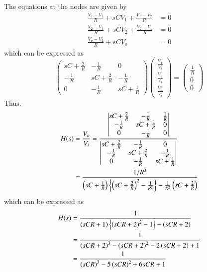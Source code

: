 \documentclass[journal,12pt,twocolumn]{IEEEtran}
\begin{document}
\solution The equations at the nodes are given by
%
\begin{align}
\frac{V_1-V_i}{R}+ {sCV_1} + \frac{V_1-V_2}{R} &= 0
\\
\frac{V_2-V_1}{R}+ {sCV_2} + \frac{V_2-V_o}{R} &= 0
\\
\frac{V_o-V_2}{R}+ {sCV_o} &= 0
\end{align}
%
which can be expressed as
%
\begin{equation}
\begin{pmatrix}
sC + \frac{2}{R} & -\frac{1}{R} & 0 
\\
-\frac{1}{R}  & sC + \frac{2}{R} & -\frac{1}{R}
\\
0 & -\frac{1}{R} & sC + \frac{1}{R} 
\end{pmatrix}
\begin{pmatrix}
\frac{V_1}{V_i}
\\
\frac{V_2}{V_i}
\\
\frac{V_o}{V_i}
\end{pmatrix}
= 
\begin{pmatrix}
\frac{1}{R}
\\
0
\\
0
\end{pmatrix}
\end{equation}
%
Thus,
\begin{align}
H(s) &= \frac{V_o}{V_i} = 
\frac{
\begin{vmatrix}
sC + \frac{2}{R} & -\frac{1}{R} & \frac{1}{R}
\\
-\frac{1}{R}  & sC + \frac{2}{R} & 0
\\
0 & -\frac{1}{R} & 0
\end{vmatrix}
}{
\begin{vmatrix}
sC + \frac{2}{R} & -\frac{1}{R} & 0 
\\
-\frac{1}{R}  & sC + \frac{2}{R} & -\frac{1}{R}
\\
0 & -\frac{1}{R} & sC + \frac{1}{R} 
\end{vmatrix}
}
\\
&= \frac{1/R^3}{\left(sC + \frac{1}{R} \right)\left\{\left(sC + \frac{2}{R} \right)^2-\frac{1}{R^2}\right\}-\frac{1}{R^2}\left(sC + \frac{2}{R} \right)}
\end{align}
%
which can be expressed as
%
\begin{align}
H(s) &= \frac{1}{\left(sCR + 1 \right)\left\{\left(sCR + 2 \right)^2-1\right\}-\left(sCR + 2 \right)}
\\
&= \frac{1}{\left(sCR + 2 \right)^3 - \left(sCR + 2 \right)^2 - 2\left(sCR + 2 \right) + 1}
\\
&= \frac{1}{\left(sCR\right)^3 - 5 \left(sCR \right)^2 + 6sCR  + 1}
\label{lpf_laplace}
\end{align}
\end{document}
